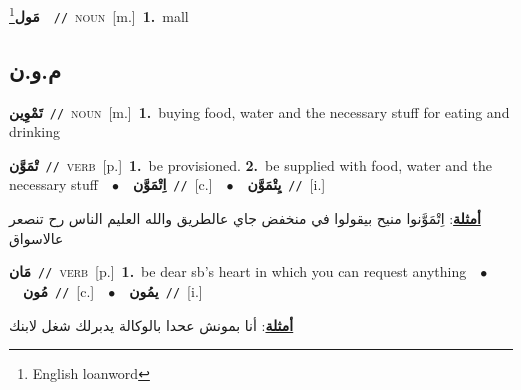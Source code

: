 \documentclass[10pt,a4paper,twoside]{article} %
\begin{document}
\begin{multicols}{2}
{\setlength\topsep{0pt}\textbf{\foreignlanguage{arabic}{مَول}}\footnote{English loanword}\ \ {\color{gray}\texttt{//}\color{black}}\ \textsc{noun}\ [m.]\ \textbf{1.}~mall\ } \vspace{2mm}

\vspace{-3mm}
\subsection*{\color{blue}\foreignlanguage{arabic}{م.و.ن}\color{blue}{}} 

{\setlength\topsep{0pt}\textbf{\foreignlanguage{arabic}{تَمْوِين}}\ {\color{gray}\texttt{//}\color{black}}\ \textsc{noun}\ [m.]\ \textbf{1.}~buying food, water and the necessary stuff for eating and drinking\ } \vspace{2mm}

{\setlength\topsep{0pt}\textbf{\foreignlanguage{arabic}{تْمَوَّن}}\ {\color{gray}\texttt{//}\color{black}}\ \textsc{verb}\ [p.]\ \textbf{1.}~be provisioned.  \textbf{2.}~be supplied with food, water and the necessary stuff\ \ $\bullet$\ \ \setlength\topsep{0pt}\textbf{\foreignlanguage{arabic}{اِتْمَوَّن}}\ {\color{gray}\texttt{//}\color{black}}\ [c.]\ \ $\bullet$\ \ \setlength\topsep{0pt}\textbf{\foreignlanguage{arabic}{يِتْمَوَّن}}\ {\color{gray}\texttt{//}\color{black}}\ [i.]\  \begin{flushright}\color{gray}\foreignlanguage{arabic}{\textbf{\underline{\foreignlanguage{arabic}{أمثلة}}}: اِتْمَوَّنوا منيح بيقولوا في منخفض جاي عالطريق والله العليم الناس رح تنصعر عالاسواق}\end{flushright}\color{black}} \vspace{2mm}

{\setlength\topsep{0pt}\textbf{\foreignlanguage{arabic}{مَان}}\ {\color{gray}\texttt{//}\color{black}}\ \textsc{verb}\ [p.]\ \textbf{1.}~be dear sb's heart in which you can request anything\ \ $\bullet$\ \ \setlength\topsep{0pt}\textbf{\foreignlanguage{arabic}{مُون}}\ {\color{gray}\texttt{//}\color{black}}\ [c.]\ \ $\bullet$\ \ \setlength\topsep{0pt}\textbf{\foreignlanguage{arabic}{يمُون}}\ {\color{gray}\texttt{//}\color{black}}\ [i.]\  \begin{flushright}\color{gray}\foreignlanguage{arabic}{\textbf{\underline{\foreignlanguage{arabic}{أمثلة}}}: أنا بمونش عحدا بالوكالة يدبرلك شغل لابنك}\end{flushright}\color{black}} \vspace{2mm}


\end{multicols}
\end{document}

